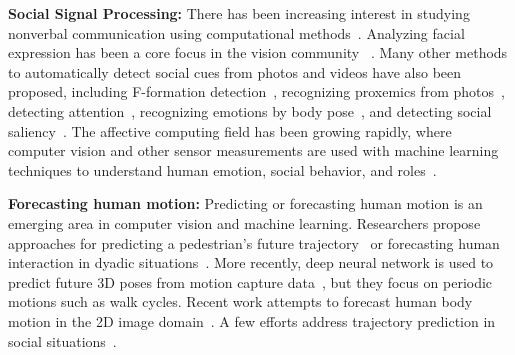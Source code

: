 




\textbf{Social Signal Processing:}
There has been increasing interest in studying nonverbal communication using computational methods~\cite{vinciarelli2009social, vinciarelli2012bridging}. Analyzing facial expression has been a core focus in the vision community ~\cite{ChuDC13, Torre15, shan2009facial}. Many other methods to automatically detect social cues from photos and videos have also been proposed, including F-formation detection~\cite{setti2015f}, recognizing proxemics from photos~\cite{yang2012recognizing}, detecting attention~\cite{Fathi-2012}, recognizing emotions by body pose~\cite{schindler2008recognizing}, and detecting social saliency~\cite{park20123d}. The affective computing field has been growing rapidly, where computer vision and other sensor measurements are used with machine learning techniques to understand human emotion, social behavior, and roles~\cite{picard1997affective, picard2003affective,poria2017review}. 

\textbf{Forecasting human motion:}
Predicting or forecasting human motion is an emerging area in computer vision and machine learning. Researchers propose approaches for predicting a pedestrian's future trajectory~\cite{kitani2012activity} or forecasting human interaction in dyadic situations~\cite{huang2014action}. More recently, deep neural network is used to predict future 3D poses from motion capture data~\cite{mnih2012conditional, Fragkiadaki_2015_ICCV, jain2016structural}, but they focus on periodic motions such as walk cycles. Recent work attempts to forecast human body motion in the 2D image domain~\cite{walker2016uncertain, villegas2017learning}. A few efforts address trajectory prediction in social situations~\cite{helbing1995social, alahi2016social, gupta2018social}. 

%

